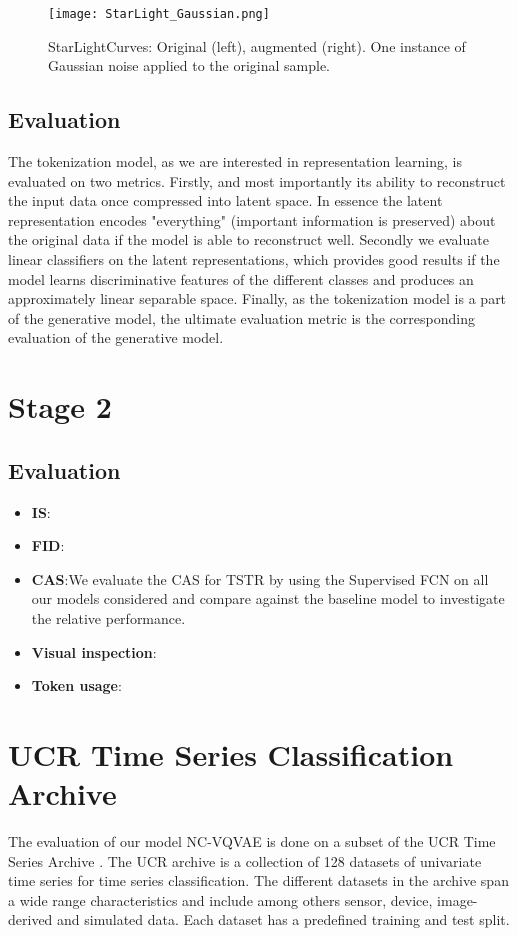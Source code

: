 \documentclass[../../thesis.tex]{subfiles}
\begin{document}
\begin{figure}[h]
    \texttt{[image: StarLight\_Gaussian.png]}
    \centering
    \caption{StarLightCurves: Original (left), augmented (right). One instance of Gaussian noise applied to the original sample.}
    \label{fig:StarLight_Gaussian}
\end{figure}

\subsection{Evaluation}

The tokenization model, as we are interested in representation learning, is evaluated on two metrics. Firstly, and most importantly its ability to reconstruct the input data once compressed into latent space. In essence the latent representation encodes "everything" (important information is preserved) about the original data if the model is able to reconstruct well. Secondly we evaluate linear classifiers on the latent representations, which provides good results if the model learns discriminative features of the different classes and produces an approximately linear separable space. Finally, as the tokenization model is a part of the generative model, the ultimate evaluation metric is the corresponding evaluation of the generative model. 



\section{Stage 2}

\subsection{Evaluation}

\begin{itemize}
    \item \textbf{IS}:
    \item \textbf{FID}:
    \item \textbf{CAS}:We evaluate the CAS for TSTR by using the Supervised FCN on all our models considered and compare against the baseline model to investigate the relative performance. 
    \item \textbf{Visual inspection}:
    \item \textbf{Token usage}:
\end{itemize}


\section{UCR Time Series Classification Archive}
The evaluation of our model NC-VQVAE is done on a subset of the UCR Time Series Archive \cite{UCRArchive2018}. The UCR archive is a collection of 128 datasets of univariate time series for time series classification. The different datasets in the archive span a wide range characteristics and include among others sensor, device, image-derived and simulated data. Each dataset has a predefined training and test split.\newline
\end{document}
